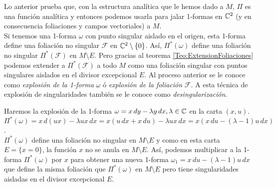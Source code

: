 Lo anterior prueba que, con la estructura analítica que le hemos dado a $M$, $\Pi$ es una función analítica y entonces podemos usarla para jalar 1-formas en $\mathbb{C}^{2}$ (y en consecuencia foliaciones y campos vectoriales) a $M$.\\

Si tenemos una 1-forma $\omega$ con punto singular aislado en el origen, esta 1-forma define una foliación no singular $\mathcal{F}$ en $\mathbb{C}^{2}\setminus\{0\}$. Así, $\Pi^{*}(\omega)$ define una foliación no singular $\Pi^{*}(\mathcal{F})$ en $M\setminus E$. Pero gracias al teorema \ref{Teo:ExtensionFoliaciones} podemos extender a $\Pi^{*}(\mathcal{F})$ a todo $M$ como una foliación singular con puntos singulares aislados en el divisor excepcional $E$. Al proceso anterior se le conoce como \emph{explosión de la 1-forma} $\omega$ ó \emph{explosión de la foliación} $\mathcal{F}$. A esta técnica de explosión de singularidades también se le conoce como \emph{desingularización}.

\begin{Ejemplo}
\label{Ej:BlowUpLineal}
Haremos la explosión de la 1-forma $\omega=x\, dy-\lambda y\, dx,\lambda\in\mathbb{C}$ en la carta $(x,u)$.\\

$\Pi^{*}(\omega)=x\, d(ux)-\lambda ux\, dx=x(u\, dx +x\, du)-\lambda ux\, dx=x(x\, du-(\lambda-1)u\, dx)$.\\

$\Pi^{*}(\omega)$ define una foliación no singular en $M\setminus E$ y como en esta carta $E=\{x=0\}$, la función $x$ no se anula en $M\setminus E$. Así, podemos multiplicar a la 1-forma $\Pi^{*}(\omega)$ por $x$ para obtener una nueva 1-forma $\omega_{1}=x\, du-(\lambda-1)u\, dx$ que define la misma foliación que $\Pi^{*}(\omega)$ en $M\setminus E$ pero tiene singularidades aisladas en el divisor excepcional $E$.
\end{Ejemplo}





